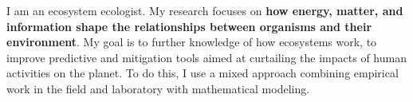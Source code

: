 

\begin{cvparagraph}

I am an ecosystem ecologist. My research focuses on \textbf{how energy, matter, and information shape the relationships between organisms and their environment}. My goal is to further knowledge of how ecosystems work, to improve predictive and mitigation tools aimed at curtailing the impacts of human activities on the planet. To do this, I use a mixed approach combining empirical work in the field and laboratory with mathematical modeling. 
\end{cvparagraph}
